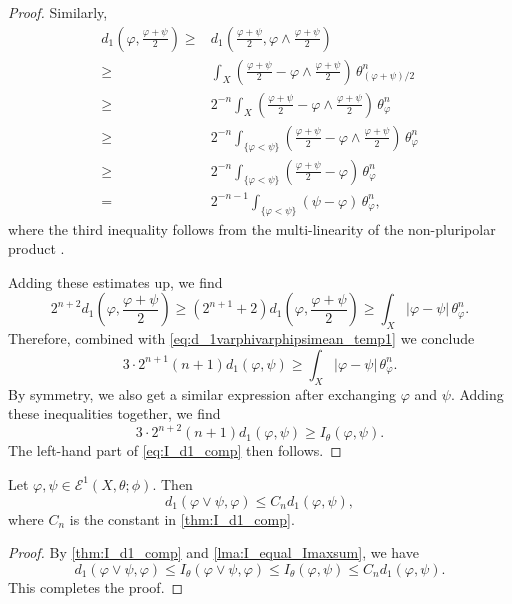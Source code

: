 \begin{proof}
    Similarly,
    \[
    \begin{aligned}
        d_1\left(\varphi,\frac{\varphi+\psi}{2}\right)\geq & d_1\left(\frac{\varphi+\psi}{2},\varphi\land \frac{\varphi+\psi}{2}\right)\\
        \geq & \int_X \left(\frac{\varphi+\psi}{2}-\varphi\land \frac{\varphi+\psi}{2}\right)\,\theta_{(\varphi+\psi)/2}^n\\
        \geq & 2^{-n} \int_X \left(\frac{\varphi+\psi}{2}-\varphi\land \frac{\varphi+\psi}{2}\right)\,\theta_{\varphi}^n\\
        \geq & 2^{-n} \int_{\{\varphi<\psi\}} \left(\frac{\varphi+\psi}{2}-\varphi\land \frac{\varphi+\psi}{2}\right)\,\theta_{\varphi}^n\\
        \geq & 2^{-n} \int_{\{\varphi<\psi\}} \left(\frac{\varphi+\psi}{2}-\varphi\right)\,\theta_{\varphi}^n\\
        =& 2^{-n-1} \int_{\{\varphi<\psi\}} \left(\psi-\varphi\right)\,\theta_{\varphi}^n,
    \end{aligned}
    \]
    where the third inequality follows from the multi-linearity of the non-pluripolar product .


    Adding these estimates up, we find
    \[
        2^{n+2} d_1\left(\varphi,\frac{\varphi+\psi}{2}\right)\geq \left(2^{n+1}+2\right) d_1\left(\varphi,\frac{\varphi+\psi}{2}\right)\geq \int_X |\varphi-\psi|\,\theta_{\varphi}^n.
    \]
    Therefore, combined with \eqref{eq:d_1varphivarphipsimean_temp1} we conclude
    \[
    3\cdot 2^{n+1}(n+1)d_1(\varphi,\psi)\geq \int_X |\varphi-\psi|\,\theta_{\varphi}^n.
    \]
    By symmetry, we also get a similar expression after exchanging $\varphi$ and $\psi$. Adding these inequalities together, we find
    \[
    3\cdot 2^{n+2}(n+1)d_1(\varphi,\psi)\geq I_{\theta}(\varphi,\psi).
    \]
    The left-hand part of \eqref{eq:I_d1_comp} then follows.
\end{proof}

\begin{corollary}\label{cor:d1maxonearg}
    Let $\varphi,\psi\in \mathcal{E}^1(X,\theta;\phi)$. Then
    \begin{equation}\label{eq:d1maxonearg}
        d_1(\varphi\lor \psi,\varphi)\leq C_n d_1(\varphi,\psi),
    \end{equation}
    where $C_n$ is the constant in \cref{thm:I_d1_comp}.
\end{corollary}
\begin{proof}
    By \cref{thm:I_d1_comp} and \cref{lma:I_equal_Imaxsum}, we have
    \[
        d_1(\varphi\lor\psi,\varphi)\leq I_{\theta}(\varphi\lor\psi,\varphi)\leq I_{\theta}(\varphi,\psi)\leq C_n d_1(\varphi,\psi).
    \]
    This completes the proof.
\end{proof}


